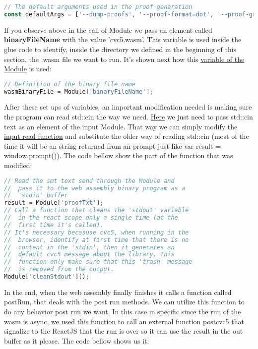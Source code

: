 \documentclass[12pt, a4paper]{article}
\begin{document}
\begin{lstlisting}[language=JavaScript]
// The default arguments used in the proof generation
const defaultArgs = ['--dump-proofs', '--proof-format=dot', '--proof-granularity=theory-rewrite', '--dag-thresh=0'];
\end{lstlisting}

If you observe above in the call of Module we pass an element called \textbf{binaryFileName} with the value ’cvc5.wasm’. This variable is used inside the glue code to identify, inside the directory we defined in the beginning of this section, the .wasm file we want to run. It's shown next how this  \href{https://github.com/ufmg-smite/proof-visualizer/blob/main/frontend/src/wasm/cvc5.js#L312-L313}{variable of the Module} is used:

\begin{lstlisting}[language=JavaScript]
// Definition of the binary file name
wasmBinaryFile = Module['binaryFileName'];
\end{lstlisting}

After these set ups of variables, an important modification needed is making sure the program can read std::cin the way we need. \href{
https://github.com/ufmg-smite/proof-visualizer/blob/main/frontend/src/wasm/cvc5.js#L730-L743}{Here} we just need to pass std::cin text as an element of the input Module. That way we can simply modify the \href{https://github.com/ufmg-smite/proof-visualizer/blob/main/frontend/src/wasm/cvc5.js#L726}{input read function} and substitute the older way of reading std::cin (most of the time it will be an string returned from an prompt just like var result = window.prompt()). The code bellow show the part of the function that was modified:

\begin{lstlisting}[language=JavaScript]
// Read the smt text send through the Module and
//  pass it to the web assembly binary program as a
//  'stdin' buffer
result = Module['proofTxt'];
// Call a function that cleans the 'stdout' variable
//  in the react scope only a single time (at the
//  first time it's called).
// It's necessary becasuse cvc5, when running in the
//  browser, identify at first time that there is no
//  content in the 'stdin', then it generates an
//  default cvc5 message about the library. This
//  function only make sure that this 'trash' message
//  is removed from the output.
Module['cleanStdout']();
\end{lstlisting}

In the end, when the web assembly finally finishes it calls a function called postRun, that deals with the post run methods. We can utilize this function to do any behavior post run we want. In this case in specific since the run of the wasm is async, \href{https://github.com/ufmg-smite/proof-visualizer/blob/main/frontend/src/wasm/cvc5.js#L264-L270}{we used this function} to call an external function postcvc5 that signalize to the ReactJS that the run is over so it can use the result in the out buffer as it please. The code bellow shows us it:
\end{document}
